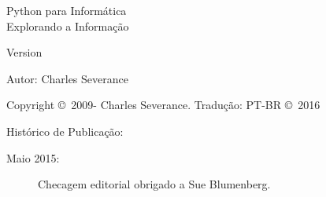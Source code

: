 



\def\exercisename{Exercício}

\newtheorem{ex}{\exercisename}[chapter]

\begin{latexonly}

\renewcommand{\blankpage}{\thispagestyle{empty} \quad \newpage}

\thispagestyle{empty}

\begin{flushright}
\vspace*{2.0in}

\begin{spacing}{3}
{\huge Python para Informática}\\
{\Large Explorando a Informação}
\end{spacing}

\vspace{0.25in}

Version \theversion

\vspace{0.5in}


{\Large
Autor: Charles Severance\\
}

\vfill

\end{flushright}

\pagebreak
\thispagestyle{empty}

{\small
Copyright \copyright ~2009- Charles Severance.
Tradução: PT-BR \copyright ~2016

Histórico de Publicação:

\begin{description}

\item[Maio 2015:] Checagem editorial obrigado a Sue Blumenberg.


\end{description}}
\end{latexonly}
